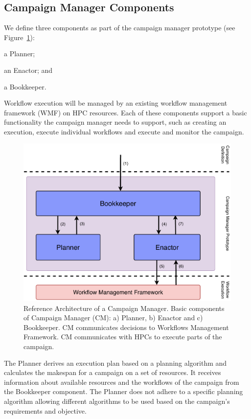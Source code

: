 \subsection{Campaign Manager Components}
\label{ssec:cm_arch}

We define three components as part of the campaign manager prototype (see 
Figure~\ref{fig:refarch}):
\begin{inparaenum}[(1)]
    \item a Planner;
    \item an Enactor; and
    \item a Bookkeeper. 
\end{inparaenum}
Workflow execution will be managed by an existing workflow management 
framework (WMF) on HPC resources. Each of these components support a basic 
functionality the campaign manager needs to support, such as creating an 
execution, execute individual workflows and execute and monitor the campaign.

\begin{figure}[t]
    \centering
    \includegraphics[width=.75\textwidth]{figures/manager/CEM_design.pdf}
    \caption{Reference Architecture of a Campaign Manager. Basic 
        components of Campaign Manager (CM): a) Planner, b) Enactor and c) Bookkeeper. 
        CM communicates decisions to Workflows Management Framework. CM communicates with HPCs to 
        execute parts of the campaign.}\label{fig:refarch}
\end{figure}

The Planner derives an execution plan based on a planning algorithm and 
calculates the makespan for a campaign on a set of resources. It receives 
information about available resources and the workflows of the campaign from 
the Bookkeeper component. The Planner does not adhere to a specific planning 
algorithm allowing different algorithms to be used based on the campaign's 
requirements and objective.

